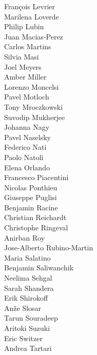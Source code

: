 \documentclass[PICOReport.tex]{subfiles}
\begin{document}
{\begin{multicols}{4}
Fran\c{c}ois Levrier            \\
Marilena Loverde                \\
Philip Lubin                    \\
Juan Macias-Perez               \\
Carlos Martins                  \\
Silvia Masi                     \\
Joel Meyers                     \\
Amber Miller                    \\
Lorenzo Moncelsi                \\
Pavel Motloch                   \\
Tony Mroczkowski                \\
Suvodip Mukherjee               \\
Johanna Nagy                    \\
Pavel Naselsky                  \\
Federico Nati                   \\
Paolo Natoli                    \\
Elena Orlando                   \\
Francesco Piacentini            \\
Nicolas Ponthieu                \\
Giuseppe Puglisi                \\
Benjamin Racine                 \\
Christian Reichardt             \\
Christophe Ringeval             \\
Anirban Roy                     \\
Jose-Alberto Rubino-Martin      \\
Maria Salatino                  \\
Benjamin Saliwanchik            \\
Neelima Sehgal                  \\
Sarah Shandera                  \\
Erik Shirokoff                  \\
An\v{z}e Slosar                 \\
Tarun Souradeep                 \\
Aritoki Suzuki                  \\
Eric Switzer                    \\
Andrea Tartari                  \\

\end{multicols}}
\end{document}
